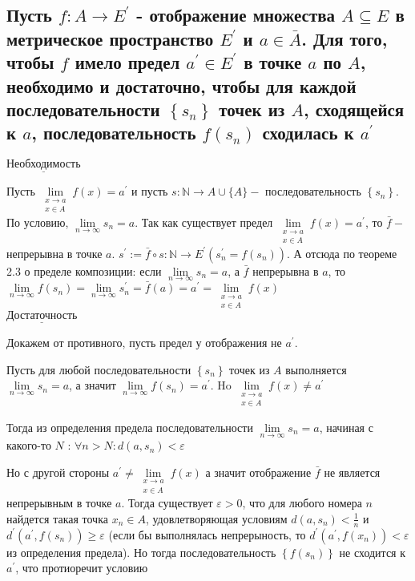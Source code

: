 \documentclass[a4paper]{article}
\begin{document}
\subsection{Пусть $f: A \rightarrow E^{\prime}$ - отображение множества $A \subseteq E$ в метрическое пространство $E^{\prime}$ и $a \in \bar{A}$. Для того, чтобы $f$ имело предел $a^{\prime} \in E^{\prime}$ в точке $a$ по $A$, необходимо и достаточно, чтобы для каждой последовательности $\left\{s_{n}\right\}$ точек из $A$, сходящейся к $a$, последовательность $f\left(s_{n}\right)$ сходилась к $a^{\prime}$}

$\underline{\text {Необходимость}}$


Пусть $\lim\limits_{\substack{x \rightarrow a \\ x \in A}} f(x)=a^{\prime}$ и пусть $s: \mathbb{N} \rightarrow A \cup\{A\}-$ последовательность $\left\{s_{n}\right\}$. По условию, $\lim\limits_{n \rightarrow \infty} s_{n}=a$. Так как существует предел $\lim\limits_{\substack{x \rightarrow a \\ x \in A}} f(x)=a^{\prime}$, то $\bar{f}-$ непрерывна в точке $a$. $s^{\prime}:=\bar{f} \circ s: \mathbb{N} \rightarrow E^{\prime}\left(s_{n}^{\prime}=f\left(s_{n}\right)\right)$. А отсюда по теореме 2.3 о пределе композиции: если $\lim\limits_{n \rightarrow \infty} s_{n}=a$, а $\bar{f}$ непрерывна в $a$, то $\lim\limits_{n \rightarrow \infty} f\left(s_{n}\right)=\lim\limits_{n \rightarrow \infty} s_{n}^{\prime}=\bar{f}(a)=a^{\prime}=\lim\limits_{\substack{x \rightarrow a \\ x \in A}} f(x)$\\[2mm]
$\underline{\text {Достаточность}}$

Докажем от противного, пусть предел у отображения не $a^{\prime}$.

Пусть для любой последовательности $\left\{s_{n}\right\}$ точек из $A$ выполняется $\lim\limits_{n \rightarrow \infty} s_{n}=a$, а значит $\lim\limits_{n \rightarrow \infty} f\left(s_{n}\right)=a^{\prime}$. Ho $\lim\limits_{\substack{x \rightarrow a \\ x \in A}} f(x) \neq a^{\prime}$

Тогда из определения предела последовательности $\lim\limits_{n \rightarrow \infty} s_{n}=a$, начиная с какого-то $N$ : $\forall n>N: d\left(a, s_{n}\right)<\varepsilon$

Но с другой стороны $a^{\prime} \neq \lim\limits_{\substack{x \rightarrow a \\ x \in A}} f(x)$ а значит отображение $\bar{f}$ не является непрерывным в точке $a$. Тогда существует $\varepsilon>0$, что для любого номера $n$ найдется такая точка $x_{n} \in A$, удовлетворяющая условиям $d\left(a, s_{n}\right)<\frac{1}{n}$ и $d^{\prime}\left(a^{\prime}, f\left(s_{n}\right)\right) \geqslant \varepsilon$ (если бы выполнялась непрерыность, то $d^{\prime}\left(a^{\prime}, f\left(x_{n}\right)\right)<\varepsilon$ из определения предела). Но тогда последовательность $\left\{f\left(s_{n}\right)\right\}$ не сходится к $a^{\prime}$, что протиоречит условию
\end{document}
